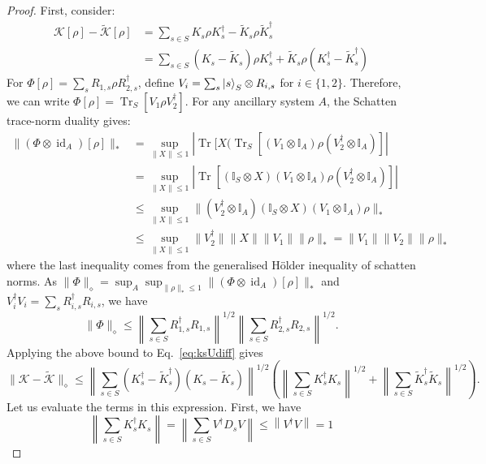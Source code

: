 \begin{proof}
First, consider:
\begin{align}
    \mathcal{K}[\rho] - \tilde{\mathcal{K}}[\rho] &= \sum_{s \in S} K_s\rho K_s^{\dagger} - \tilde K_s\rho \tilde K_s^{\dagger} \\
    &= \sum_{s \in S} (K_s-\tilde K_s)\rho K_s^{\dagger} +\tilde K_s\rho (K_s^{\dagger}- \tilde K_s^{\dagger}) \label{eq:ksUdiff}
\end{align}
For $\Phi[\rho]=\sum_sR_{1,s}\rho R_{2,s}^\dagger$, define $V_i=\sum_s\ket{s}_S\otimes R_{i,s}$ for $i \in \{1,2\}$. Therefore, we can write $\Phi[\rho] = \operatorname{Tr}_S[V_1\rho V_2^{\dagger}]$. For any ancillary system $A$, the Schatten trace-norm duality gives:
\begin{align}
    \|(\Phi\otimes\operatorname{id}_A)[\rho]\|_* &= \sup_{\|X\|\leq 1} | \operatorname{Tr}[X (\operatorname{Tr}_S[(V_1\otimes \mathbb{I}_A) \rho (V_2^{\dagger}\otimes \mathbb{I}_A)]|\\
    &=\sup_{\|X\|\leq 1} | \operatorname{Tr}[(\mathbb{I}_S \otimes X ) (V_1\otimes \mathbb{I}_A) \rho (V_2^{\dagger}\otimes \mathbb{I}_A)]|\\
    &\leq\sup_{\|X\|\leq 1} \| (V_2^{\dagger}\otimes \mathbb{I}_A)(\mathbb{I}_S \otimes X ) (V_1\otimes \mathbb{I}_A) \rho \|_*\\
    &\leq \sup_{\|X\|\leq 1} \| V_2^{\dagger}\|\|X\| \|V_1\| \| \rho \|_* = \|V_1\|\| V_2\| \| \rho \|_*
\end{align}
where the last inequality comes from the generalised H\"older inequality of schatten norms. As $\|\Phi\|_{\diamond} = \sup_A\sup_{\|\rho\|_*\leq 1}\|(\Phi\otimes\operatorname{id}_A)[\rho]\|_*$ and
\(V_i^\dagger V_i=\sum_sR_{i,s}^\dagger R_{i,s}\), we have
\begin{equation}
\|\Phi\|_\diamond
\leq
\left\|\sum_{s\in S}R_{1,s}^\dagger R_{1,s}\right\|^{1/2}
\left\|\sum_{s\in S}R_{2,s}^\dagger R_{2,s}\right\|^{1/2}.
\end{equation}
Applying the above bound to Eq.~\eqref{eq:ksUdiff}
gives
\begin{equation}
\|\mathcal{K}-\tilde{\mathcal{K}}\|_\diamond
\leq
\left\|\sum_{s\in S}(K_s^\dagger - \tilde K_s^\dagger)(K_s - \tilde K_s)\right\|^{1/2}
\left(
\left\|\sum_{s\in S}K_s^\dagger K_s\right\|^{1/2}
+
\left\|\sum_{s\in S}\tilde K_s^\dagger\tilde K_s\right\|^{1/2}
\right).
\label{eq:row-column-bound}
\end{equation}
Let us evaluate the terms in this expression. First, we have
\begin{equation}
     \left\|\sum_{s\in S} K_s^{\dagger}  K_s \right\| = \left\|\sum_{s\in S}  V^{\dagger}D_sV \right\| \leq  \left\|V^{\dagger} V\right\| = 1
\end{equation}


\end{proof}
